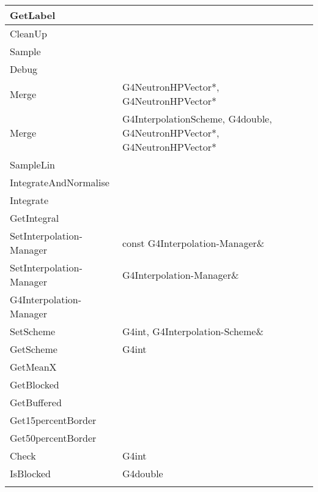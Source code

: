 \documentclass[12pt]{article}
\begin{document}
\begin{longtable}{p{}p{}p{}}
GetLabel & & \\\hline
CleanUp & & \\\hline
Sample & & \\\hline
Debug & & \\\hline
Merge & G4NeutronHPVector*,  G4NeutronHPVector* & \\\hline
Merge & G4InterpolationScheme, G4double, G4NeutronHPVector*, G4NeutronHPVector* &\\\hline
SampleLin & & \\\hline
IntegrateAndNormalise & & \\\hline
Integrate & & \\\hline
GetIntegral & & \\\hline
SetInterpolation-Manager & const G4Interpolation-Manager\& &\\\hline
SetInterpolation-Manager & G4Interpolation-Manager\& & \\\hline
G4Interpolation-Manager & & \\\hline
SetScheme & G4int, G4Interpolation-Scheme\& & \\\hline
GetScheme & G4int & \\\hline
GetMeanX & & \\\hline
GetBlocked & & \\\hline
GetBuffered & & \\\hline
Get15percentBorder & &  \\\hline
Get50percentBorder & &  \\\hline
Check & G4int & \\\hline
IsBlocked & G4double & \\
\arrayrulecolor{black}
\bottomrule
\end{longtable}
\end{document}
